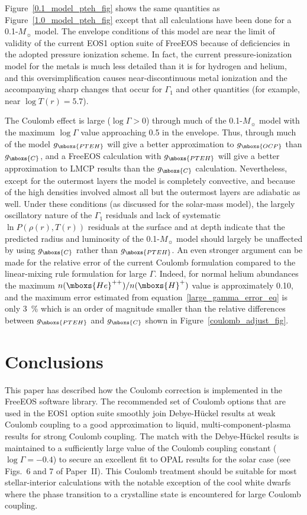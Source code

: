 Figure~\ref{0.1_model_pteh_fig} shows the same quantities as
Figure~\ref{1.0_model_pteh_fig} except that all calculations have been done
for a 0.1-$M_\sun$ model.  The envelope conditions of this model are near
the limit of validity of the current EOS1 option suite of FreeEOS because of
deficiencies in the adopted pressure ionization scheme.  In fact, the
current pressure-ionization model for the metals is much less detailed than
it is for hydrogen and helium, and this oversimplification causes
near-discontinuous metal ionization and the accompanying sharp changes that
occur for $\Gamma_1$ and other quantities (for example, near $\log T(r) =
5.7$).

The Coulomb effect is large ($\log \Gamma > 0$) through much of the
0.1-$M_\sun$ model with the maximum $\log \Gamma$ value approaching 0.5 in
the envelope.  Thus, through much of the model $g_{\mboxs{PTEH}}$ will give
a better approximation to $g_{\mboxs{OCP}}$ than $g_{\mboxs{C}}$, and a
FreeEOS calculation with $g_{\mboxs{PTEH}}$ will give a better approximation
to LMCP results than the $g_{\mboxs{C}}$ calculation.  Nevertheless, except
for the outermost layers the model is completely convective, and because of
the high densities involved almost all but the outermost layers are
adiabatic as well. Under these conditions (as discussed for the solar-mass
model), the largely oscillatory nature of the $\Gamma_1$ residuals and lack
of systematic $\ln P(\rho(r),T(r))$ residuals at the surface and at depth
indicate that the predicted radius and luminosity of the 0.1-$M_\sun$ model
should largely be unaffected by using $g_{\mboxs{C}}$ rather than
$g_{\mboxs{PTEH}}$.  An even stronger argument can be made for the relative
error of the current Coulomb formulation compared to the linear-mixing rule
formulation for large $\Gamma$.  Indeed, for normal helium abundances the
maximum $n(\mboxs{He}^{++})/n(\mboxs{H}^{+})$ value is approximately 0.10,
and the maximum error estimated from equation~\ref{large_gamma_error_eq} is
only 3~\% which is an order of magnitude smaller than the relative
differences between $g_{\mboxs{PTEH}}$ and $g_{\mboxs{C}}$ shown in
Figure~\ref{coulomb_adjust_fig}.

\section{Conclusions }

This paper has described how the Coulomb correction is implemented in the
FreeEOS software library. The recommended set of Coulomb options that are
used in the EOS1 option suite smoothly join Debye-H\"uckel results at weak
Coulomb coupling to a good approximation to liquid, multi-component-plasma
results for strong Coulomb coupling.  The match with the Debye-H\"uckel
results is maintained to a sufficiently large value of the Coulomb coupling
constant ($\log \Gamma = -0.4$) to secure an excellent fit to OPAL results
for the solar case (see Figs.~6 and 7 of Paper~II). This Coulomb treatment
should be suitable for most stellar-interior calculations with the notable
exception of the cool white dwarfs where the phase transition to a
crystalline state is encountered for large Coulomb coupling.

